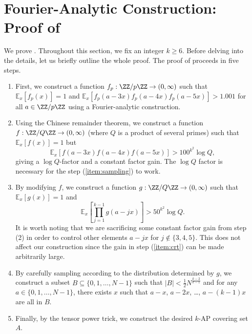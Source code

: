 \documentclass[11pt,reqno]{amsart}
\begin{document}
\section{Fourier-Analytic Construction: 
Proof of \texorpdfstring{}{Theorem \ref{thm:fourier}}}
\label{sec:fourier}
We prove .
Throughout this section, we fix an integer $k\geq 6$.
Before delving into the details, let us briefly outline 
the whole proof.
The proof of  proceeds in five steps.
\begin{enumerate}
\item \label{item:fourier} 
First, we construct a function $f_p : \ZZ/p\ZZ\to (0,\infty)$
such that $\mathbb E_x[f_p(x)]=1$
and $\mathbb E_x[f_p(a-3x)f_p(a-4x)f_p(a-5x)] > 1.001$
for all $a\in\ZZ/p\ZZ$ using a Fourier-analytic construction.
\item \label{item:crt}
Using the Chinese remainder theorem, we construct 
a function $f : \ZZ/Q\ZZ \to (0,\infty)$
(where $Q$ is a product of several primes)
such that $\mathbb E_x[f(x)]=1$
but 
$$\mathbb E_x[f(a-3x)f(a-4x)f(a-5x)] > 100^{k^2} \log Q,$$
giving a $\log Q$-factor and a constant factor gain.
The $\log Q$ factor is necessary 
for the step (\ref{item:sampling}) to work.
\item \label{item:smoothing}
By modifying $f$, we construct a function 
$g : \ZZ/Q\ZZ \to (0,\infty)$ such that 
$\mathbb E_x[g(x)]=1$ and 
$$\mathbb E_x\left[\prod_{j=1}^{k-1} g(a-jx)\right] 
> 50^{k^2}\log Q.$$
It is worth noting that we are sacrificing
some constant factor gain from step (2)
in order to control other elements 
$a-jx$ for $j\notin \{3,4,5\}$.
This does not affect our construction since the 
gain in step (\ref{item:crt}) can be made arbitrarily large.
\item \label{item:sampling}
By carefully sampling according to the distribution determined by $g$,
we construct a subset $B\subseteq \{0,1,\dots,N-1\}$ such that 
$|B| < \frac 12 N^{\frac{k-2}{k-1}}$
and for any $a\in \{0,1,\dots,N-1\}$, there exists $x$ such that 
$a-x$, $a-2x$, \dots, $a-(k-1)x$ are all in $B$.
\item \label{item:tensor}
Finally, by the tensor power trick, we 
construct the desired $k$-AP covering set $A$.
\end{enumerate}
\end{document}
